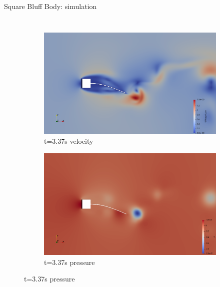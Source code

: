 \documentclass[10pt,t]{beamer}
\begin{document}
\begin{frame}{Square Bluff Body: simulation}

\begin{columns}


\begin{figure}[t]
\vspace*{-0.8cm}
\centering %
\begin{subfigure}{0.5\textwidth}
  \includegraphics[width=\linewidth]{images/sq-cyl/sq_v1.png}
  \caption{t=3.37s velocity}
\end{subfigure}\hfil %
\begin{subfigure}{0.5\textwidth}
  \includegraphics[width=\linewidth]{images/sq-cyl/sq_p1.png}
  \caption{t=3.37s pressure}
\end{subfigure}\hfil %


\end{figure}
\end{columns}
\end{frame}
\end{document}
